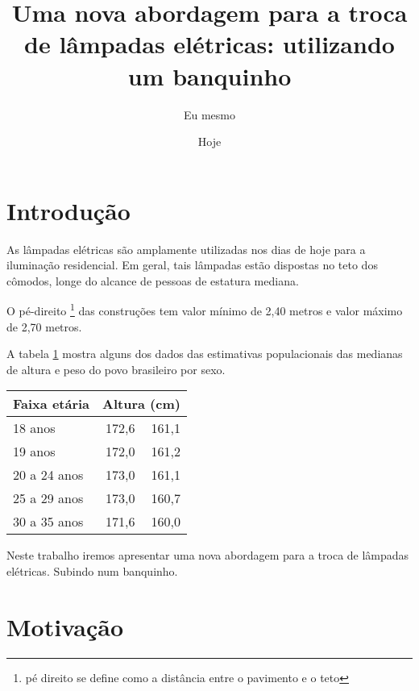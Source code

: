 \documentclass{article}
\author{Eu mesmo}
\date{Hoje}
\title{Uma nova abordagem para a troca de
       lâmpadas elétricas: utilizando um banquinho}
\begin{document}
\maketitle

\newpage

\section{Introdução}
\label{sec:intro}

As lâmpadas elétricas são amplamente utilizadas nos dias
de hoje para a iluminação residencial.
Em geral, tais lâmpadas estão dispostas no teto dos cômodos,
longe do alcance de pessoas de estatura mediana.

O pé-direito 
\footnote{pé direito se define como a distância entre o pavimento e o teto}
das construções tem valor mínimo de 2,40 metros e valor máximo de 2,70 metros.

A tabela \ref{tab:ibge} mostra alguns dos dados das estimativas populacionais das
medianas de altura e peso do povo brasileiro por sexo.

\begin{table}[!htb]
  	\centering
  	\begin{tabular}{|l|r|r|}
  	\hline
    Faixa etária & \multicolumn{2}{|c|}{Altura (cm)} \\ \hline
    18      anos & 172,6 & 161,1 \\
    19      anos & 172,0 & 161,2 \\
    20 a 24 anos & 173,0 & 161,1 \\
    25 a 29 anos & 173,0 & 160,7 \\
    30 a 35 anos & 171,6 & 160,0 \\
    \hline
    \end{tabular}
    \label{tab:ibge}
\end{table}

Neste trabalho  iremos apresentar uma nova abordagem
para a troca  de lâmpadas elétricas.
Subindo  num  banquinho. %


\section{Motivação}
\label{sec:motiv}
\end{document}
